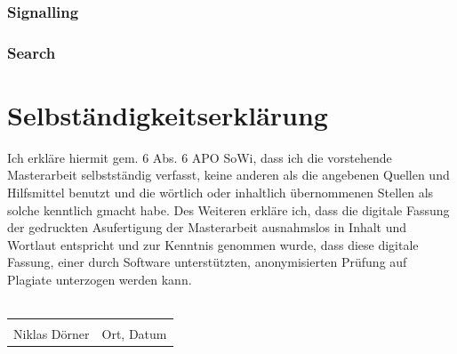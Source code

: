 \documentclass[a4paper, 11 pt, fleqn]{article}
\begin{document}
\subsubsection{Signalling}
%
\subsubsection{Search}
%
\newpage
{}


\newpage
\section*{Selbständigkeitserklärung}
Ich erkläre hiermit gem. \text{\S}6 Abs. 6 APO SoWi, dass ich die vorstehende Masterarbeit selbstständig verfasst, keine anderen
als die angebenen Quellen und Hilfsmittel benutzt und die wörtlich oder inhaltlich übernommenen Stellen als solche kenntlich
gmacht habe. Des Weiteren erkläre ich, dass die digitale Fassung der gedruckten Asufertigung der Masterarbeit ausnahmslos
in Inhalt und Wortlaut entspricht und zur Kenntnis genommen wurde, dass diese digitale Fassung, einer durch Software
unterstützten, anonymisierten Prüfung auf Plagiate unterzogen werden kann. \\
\vspace*{1 cm}
\\
\noindent\begin{tabular}{ll}
	\makebox[2.5in]{\hrulefill} & \makebox[2.5in]{\hrulefill}\\
	Niklas D\"orner & Ort, Datum\\[8ex]%
\end{tabular}
%
\end{document}
